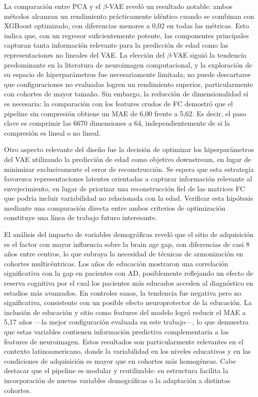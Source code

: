 La comparación entre PCA y el $\beta$-VAE reveló un resultado notable: ambos métodos alcanzan un rendimiento prácticamente idéntico cuando se combinan con XGBoost optimizado, con diferencias menores a 0,02 en todas las métricas. Esto indica que, con un regresor suficientemente potente, las componentes principales capturan tanta información relevante para la predicción de edad como las representaciones no lineales del VAE. La elección del $\beta$-VAE siguió la tendencia predominante en la literatura de neuroimagen computacional, y la exploración de su espacio de hiperparámetros fue necesariamente limitada; no puede descartarse que configuraciones no evaluadas logren un rendimiento superior, particularmente con cohortes de mayor tamaño. Sin embargo, la reducción de dimensionalidad sí es necesaria: la comparación con los features crudos de FC demostró que el pipeline sin compresión obtiene un MAE de 6,00 frente a 5,62. Es decir, el paso clave es comprimir las 6670 dimensiones a 64, independientemente de si la compresión es lineal o no lineal.

Otro aspecto relevante del diseño fue la decisión de optimizar los hiperparámetros del VAE utilizando la predicción de edad como objetivo downstream, en lugar de minimizar exclusivamente el error de reconstrucción. Se espera que esta estrategia favorezca representaciones latentes orientadas a capturar información relevante al envejecimiento, en lugar de priorizar una reconstrucción fiel de las matrices FC que podría incluir variabilidad no relacionada con la edad. Verificar esta hipótesis mediante una comparación directa entre ambos criterios de optimización constituye una línea de trabajo futuro interesante.

El análisis del impacto de variables demográficas reveló que el sitio de adquisición es el factor con mayor influencia sobre la brain age gap, con diferencias de casi 8 años entre centros, lo que subraya la necesidad de técnicas de armonización en cohortes multicéntricas. Los años de educación mostraron una correlación significativa con la gap en pacientes con AD, posiblemente reflejando un efecto de reserva cognitiva por el cual los pacientes más educados acceden al diagnóstico en estadios más avanzados. En controles sanos, la tendencia fue negativa pero no significativa, consistente con un posible efecto neuroprotector de la educación. La inclusión de educación y sitio como features del modelo logró reducir el MAE a 5,17 años ---la mejor configuración evaluada en este trabajo---, lo que demuestra que estas variables contienen información predictiva complementaria a las features de neuroimagen. Estos resultados son particularmente relevantes en el contexto latinoamericano, donde la variabilidad en los niveles educativos y en las condiciones de adquisición es mayor que en cohortes más homogéneas. Cabe destacar que el pipeline es modular y reutilizable: su estructura facilita la incorporación de nuevas variables demográficas o la adaptación a distintas cohortes.

